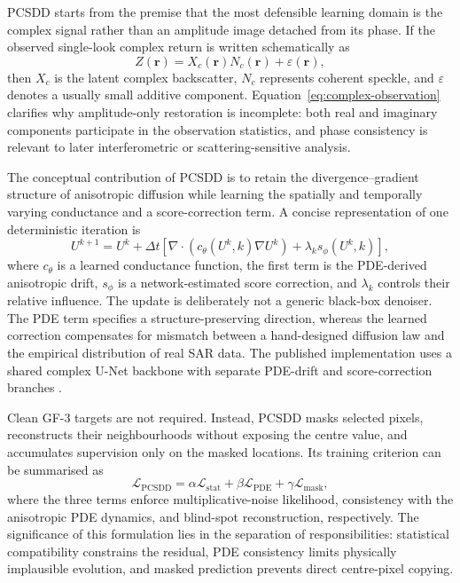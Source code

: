 \documentclass[11pt]{article}
\begin{document}
PCSDD starts from the premise that the most defensible learning domain is the complex signal rather than an amplitude image detached from its phase. If the observed single-look complex return is written schematically as
\begin{equation}
Z(\mathbf{r})=X_c(\mathbf{r})N_c(\mathbf{r})+\varepsilon(\mathbf{r}),
\label{eq:complex-observation}
\end{equation}
then $X_c$ is the latent complex backscatter, $N_c$ represents coherent speckle, and $\varepsilon$ denotes a usually small additive component. Equation~\eqref{eq:complex-observation} clarifies why amplitude-only restoration is incomplete: both real and imaginary components participate in the observation statistics, and phase consistency is relevant to later interferometric or scattering-sensitive analysis.

The conceptual contribution of PCSDD is to retain the divergence--gradient structure of anisotropic diffusion while learning the spatially and temporally varying conductance and a score-correction term. A concise representation of one deterministic iteration is
\begin{equation}
U^{k+1}=U^{k}+\Delta t\left[
\nabla\!\cdot\!\left(c_{\theta}(U^{k},k)\nabla U^{k}\right)
+\lambda_k s_{\phi}(U^{k},k)
\right],
\label{eq:pcsdd-update}
\end{equation}
where $c_{\theta}$ is a learned conductance function, the first term is the PDE-derived anisotropic drift, $s_{\phi}$ is a network-estimated score correction, and $\lambda_k$ controls their relative influence. The update is deliberately not a generic black-box denoiser. The PDE term specifies a structure-preserving direction, whereas the learned correction compensates for mismatch between a hand-designed diffusion law and the empirical distribution of real SAR data. The published implementation uses a shared complex U-Net backbone with separate PDE-drift and score-correction branches \cite{Xiong2026PCSDD}.

Clean GF-3 targets are not required. Instead, PCSDD masks selected pixels, reconstructs their neighbourhoods without exposing the centre value, and accumulates supervision only on the masked locations. Its training criterion can be summarised as
\begin{equation}
\mathcal{L}_{\mathrm{PCSDD}}
=\alpha\mathcal{L}_{\mathrm{stat}}
+\beta\mathcal{L}_{\mathrm{PDE}}
+\gamma\mathcal{L}_{\mathrm{mask}},
\label{eq:pcsdd-loss}
\end{equation}
where the three terms enforce multiplicative-noise likelihood, consistency with the anisotropic PDE dynamics, and blind-spot reconstruction, respectively. The significance of this formulation lies in the separation of responsibilities: statistical compatibility constrains the residual, PDE consistency limits physically implausible evolution, and masked prediction prevents direct centre-pixel copying.
\end{document}
